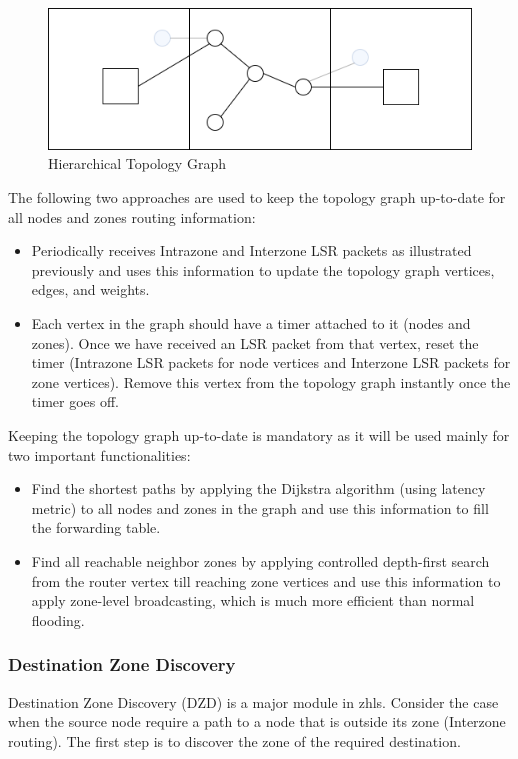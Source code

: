 \begin{figure}[!htb]
    \centering
    \includegraphics[width=\linewidth]{images/topology.png}
    \caption{Hierarchical Topology Graph}
    \label{fig:topology}
\end{figure} 
The following two approaches are used to keep the topology graph up-to-date for all nodes and zones routing information:
\begin{itemize}[itemsep=1pt, topsep=5pt]
    \item Periodically receives Intrazone and Interzone LSR packets as illustrated previously and uses this information to update the topology graph vertices, edges, and weights.
    \item Each vertex in the graph should have a timer attached to it (nodes and zones). Once we have received an LSR packet from that vertex, reset the timer (Intrazone LSR packets for node vertices and Interzone LSR packets for zone vertices). Remove this vertex from the topology graph instantly once the timer goes off.\\
\end{itemize} 
Keeping the topology graph up-to-date is mandatory as it will be used mainly for two important functionalities: 
\begin{itemize}[itemsep=1pt, topsep=5pt]
    \item Find the shortest paths by applying the Dijkstra algorithm (using latency metric) to all nodes and zones in the graph and use this information to fill the forwarding table.
    \item Find all reachable neighbor zones by applying controlled depth-first search from the router vertex till reaching zone vertices and use this information to apply zone-level broadcasting, which is much more efficient than normal flooding.
\end{itemize}

\subsubsection{Destination Zone Discovery}
Destination Zone Discovery (DZD) is a major module in  \acrfull{zhls}. Consider the case when the source node require a path to a node that is outside its zone (Interzone routing). The first step is to discover the zone of the required destination. 

